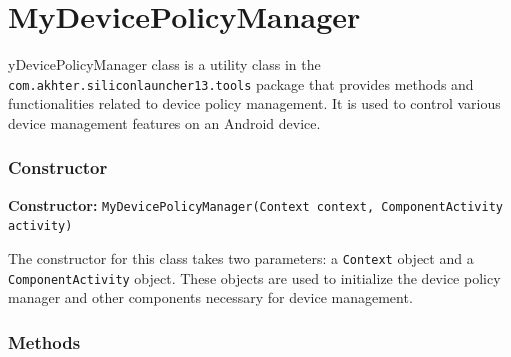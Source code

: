 {\color{BrickRed}\chapter{MyDevicePolicyManager}\label{appendix:MyDevicePolicyManager}}




yDevicePolicyManager class is a utility class in the \texttt{com.akhter.siliconlauncher13.tools} package that provides methods and functionalities related to device policy management. It is used to control various device management features on an Android device.

\subsection{Constructor}

\textbf{Constructor:} \texttt{MyDevicePolicyManager(Context context, ComponentActivity activity)}

The constructor for this class takes two parameters: a \texttt{Context} object and a \texttt{ComponentActivity} object. These objects are used to initialize the device policy manager and other components necessary for device management.

\subsection{Methods}

